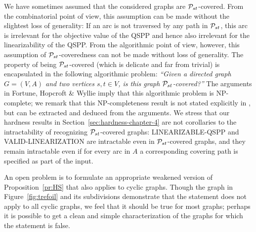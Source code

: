 We have sometimes assumed that the considered graphs are ${\cal P}_{st}$-covered.
From the combinatorial point of view, this assumption can be made without the slightest loss 
of generality: If an arc is not traversed by any path in ${\cal P}_{st}$, this arc is irrelevant for 
the objective value of the QSPP and hence also irrelevant for the linearizability of the QSPP.
From the algorithmic point of view, however, this assumption of ${\cal P}_{st}$-coveredness can not be 
made without loss of generality.
The property of being ${\cal P}_{st}$-covered (which is delicate and far from trivial) is encapsulated
in the following algorithmic problem:
\emph{``Given a directed graph $G=(V,A)$ and two vertices $s,t\in V$, is this graph ${\cal P}_{st}$-covered?''}
The arguments in Fortune, Hopcroft \& Wyllie \cite{FoHoWy1980} imply that this algorithmic
problem is NP-complete; we remark that this NP-completeness result is not stated explicitly in
\cite{FoHoWy1980}, but can be extracted and deduced from the arguments.
We stress that our hardness results in Section~\ref{sec:hardness-chapter-4} are not corollaries to the 
intractability of recognizing ${\cal P}_{st}$-covered graphs: LINEARIZABLE-QSPP and VALID-LINEARIZATION 
are intractable even in ${\cal P}_{st}$-covered graphs, and they remain intractable even if for every 
arc in $A$ a corresponding covering path is specified as part of the input.

An open problem is to formulate an appropriate weakened version of Proposition~\ref{pr:HS} 
that also applies to cyclic graphs.
Though the graph in Figure~\ref{fig:trefoil} and its subdivisions demonstrate that the 
statement does not apply to all cyclic graphs, we feel that it should be true for most graphs; 
perhaps it is possible to get a clean and simple characterization of the graphs for which the
statement is false.

